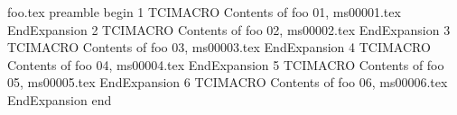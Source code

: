 foo.tex preamble
begin
1
TCIMACRO
Contents of foo 01, ms00001.tex
EndExpansion
2
TCIMACRO
Contents of foo 02, ms00002.tex
EndExpansion
3
TCIMACRO
Contents of foo 03, ms00003.tex
EndExpansion
4
TCIMACRO
Contents of foo 04, ms00004.tex
EndExpansion
5
TCIMACRO
Contents of foo 05, ms00005.tex
EndExpansion
6
TCIMACRO
Contents of foo 06, ms00006.tex
EndExpansion
end
